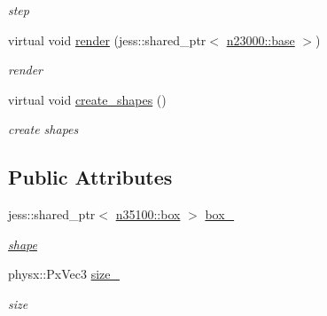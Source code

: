 \begin{DoxyCompactItemize}
\begin{DoxyCompactList}\small\item\em step \item\end{DoxyCompactList}\item 
virtual void \hyperlink{classnebula_1_1content_1_1actor_1_1admin_1_1rigid__dynamic__box_a7e5e4c2e52b7b02c7d667cb74926e8a2}{render} (jess::shared\_\-ptr$<$ \hyperlink{classnebula_1_1platform_1_1renderer_1_1base}{n23000::base} $>$)
\begin{DoxyCompactList}\small\item\em render \item\end{DoxyCompactList}\item 
virtual void \hyperlink{classnebula_1_1content_1_1actor_1_1admin_1_1rigid__dynamic__box_ad0aba702fbf1cb38fabc3b84f6a2ef93}{create\_\-shapes} ()
\begin{DoxyCompactList}\small\item\em create shapes \item\end{DoxyCompactList}\end{DoxyCompactItemize}
\subsection*{Public Attributes}
\begin{DoxyCompactItemize}
\item 
jess::shared\_\-ptr$<$ \hyperlink{classnebula_1_1content_1_1shape_1_1admin_1_1box}{n35100::box} $>$ \hyperlink{classnebula_1_1content_1_1actor_1_1admin_1_1rigid__dynamic__box_a68147cc3bbe6f978b152540a0caa72cd}{box\_\-}
\begin{DoxyCompactList}\small\item\em \hyperlink{namespacenebula_1_1content_1_1shape}{shape} \item\end{DoxyCompactList}\item 
physx::PxVec3 \hyperlink{classnebula_1_1content_1_1actor_1_1admin_1_1rigid__dynamic__box_a67f543464bdf8b405b1c20a2d508ad0c}{size\_\-}
\begin{DoxyCompactList}\small\item\em size \item\end{DoxyCompactList}\end{DoxyCompactItemize}
